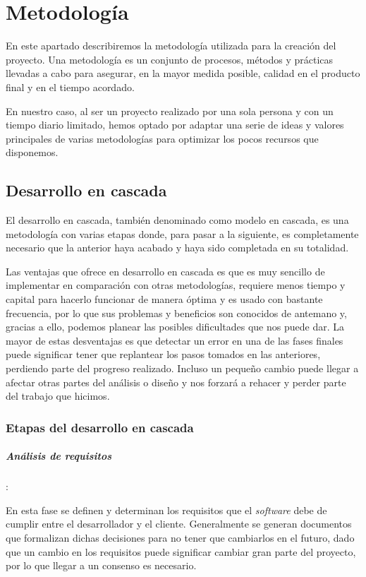 \chapter{Metodología}

En este apartado describiremos la metodología utilizada para la creación del proyecto. Una metodología es un conjunto de procesos, métodos y prácticas llevadas a cabo para asegurar, en la mayor medida posible, calidad en el producto final y en el tiempo acordado.

En nuestro caso, al ser un proyecto realizado por una sola persona y con un tiempo diario limitado, hemos optado por adaptar una serie de ideas y valores principales de varias metodologías para optimizar los pocos recursos que disponemos.

\section{Desarrollo en cascada}

El desarrollo en cascada, también denominado como modelo en cascada, es una metodología con varias etapas donde, para pasar a la siguiente, es completamente necesario que la anterior haya acabado y haya sido completada en su totalidad.

Las ventajas que ofrece en desarrollo en cascada es que es muy sencillo de implementar en comparación con otras metodologías, requiere menos tiempo y capital para hacerlo funcionar de manera óptima y es usado con bastante frecuencia, por lo que sus problemas y beneficios son conocidos de antemano y, gracias a ello, podemos planear las posibles dificultades que nos puede dar. La mayor de estas desventajas es que detectar un error en una de las fases finales puede significar tener que replantear los pasos tomados en las anteriores, perdiendo parte del progreso realizado. Incluso un pequeño cambio puede llegar a afectar otras partes del análisis o diseño y nos forzará a rehacer y perder parte del trabajo que hicimos. 

\subsection{Etapas del desarrollo en cascada}

\paragraph{Análisis de requisitos}: 

En esta fase se definen y determinan los requisitos que el \textit{software} debe de cumplir entre el desarrollador y el cliente. Generalmente se generan documentos que formalizan dichas decisiones para no tener que cambiarlos en el futuro, dado que un cambio en los requisitos puede significar cambiar gran parte del proyecto, por lo que llegar a un consenso es necesario.

